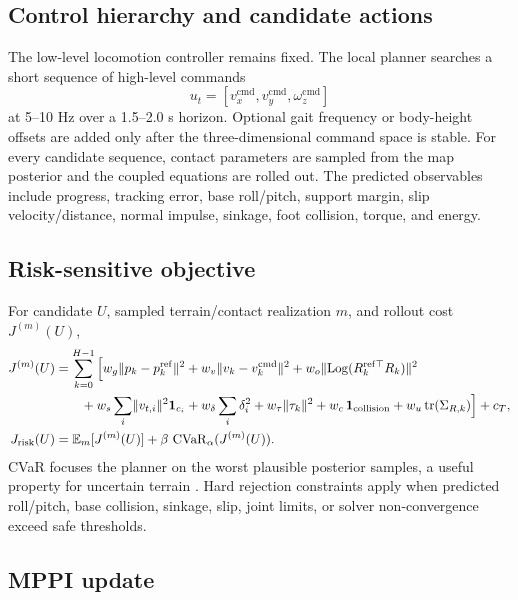 \subsection{Control hierarchy and candidate actions}

The low-level locomotion controller remains fixed. The local planner searches a short sequence of high-level commands
\begin{equation}
u_t=[v_x^{\mathrm{cmd}},v_y^{\mathrm{cmd}},\omega_z^{\mathrm{cmd}}]
\label{eq:action}
\end{equation}
at 5--10 Hz over a 1.5--2.0 s horizon. Optional gait frequency or body-height offsets are added only after the three-dimensional command space is stable. For every candidate sequence, contact parameters are sampled from the map posterior and the coupled equations are rolled out. The predicted observables include progress, tracking error, base roll/pitch, support margin, slip velocity/distance, normal impulse, sinkage, foot collision, torque, and energy.

\subsection{Risk-sensitive objective}

For candidate $U$, sampled terrain/contact realization $m$, and rollout cost $J^{(m)}(U)$,
\begin{align}
J^{(m)}(U)&=\sum_{k=0}^{H-1}\Big[
w_g\lVert p_k-p_k^{\mathrm{ref}}\rVert^2
+w_v\lVert v_k-v_k^{\mathrm{cmd}}\rVert^2
+w_o\lVert\operatorname{Log}(R_k^{\mathrm{ref}\top}R_k)\rVert^2 \\
&\qquad+w_s\sum_i\lVert v_{t,i}\rVert^2\mathbf1_{c_i}
+w_\delta\sum_i\delta_i^2
+w_\tau\lVert\tau_k\rVert^2
+w_c\,\mathbf1_{\mathrm{collision}}
+w_u\operatorname{tr}(\Sigma_{R,k})\Big]+c_T,\\
J_{\mathrm{risk}}(U)&=\mathbb{E}_m[J^{(m)}(U)]
+\beta\,\operatorname{CVaR}_\alpha(J^{(m)}(U)).
\label{eq:risk_cost}
\end{align}
CVaR focuses the planner on the worst plausible posterior samples, a useful property for uncertain terrain \citep{rockafellar2000cvar,cai2024pietra}. Hard rejection constraints apply when predicted roll/pitch, base collision, sinkage, slip, joint limits, or solver non-convergence exceed safe thresholds.

\subsection{MPPI update}


